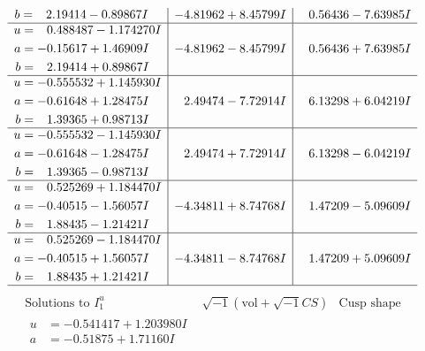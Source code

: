 \documentclass[1p]{elsarticle_modified}
\theoremstyle{definition}
\newcommand{\I}{\sqrt{-1}}
\begin{document}
$$\begin{array}{c|c|c}
\begin{aligned}
b &= \phantom{-}2.19414 - 0.89867 I\end{aligned}
 & -4.81962 + 8.45799 I & \phantom{-}0.56436 - 7.63985 I \\ \hline\begin{aligned}
u &= \phantom{-}0.488487 - 1.174270 I \\
a &= -0.15617 + 1.46909 I \\
b &= \phantom{-}2.19414 + 0.89867 I\end{aligned}
 & -4.81962 - 8.45799 I & \phantom{-}0.56436 + 7.63985 I \\ \hline\begin{aligned}
u &= -0.555532 + 1.145930 I \\
a &= -0.61648 + 1.28475 I \\
b &= \phantom{-}1.39365 + 0.98713 I\end{aligned}
 & \phantom{-}2.49474 - 7.72914 I & \phantom{-}6.13298 + 6.04219 I \\ \hline\begin{aligned}
u &= -0.555532 - 1.145930 I \\
a &= -0.61648 - 1.28475 I \\
b &= \phantom{-}1.39365 - 0.98713 I\end{aligned}
 & \phantom{-}2.49474 + 7.72914 I & \phantom{-}6.13298 - 6.04219 I \\ \hline\begin{aligned}
u &= \phantom{-}0.525269 + 1.184470 I \\
a &= -0.40515 - 1.56057 I \\
b &= \phantom{-}1.88435 - 1.21421 I\end{aligned}
 & -4.34811 + 8.74768 I & \phantom{-}1.47209 - 5.09609 I \\ \hline\begin{aligned}
u &= \phantom{-}0.525269 - 1.184470 I \\
a &= -0.40515 + 1.56057 I \\
b &= \phantom{-}1.88435 + 1.21421 I\end{aligned}
 & -4.34811 - 8.74768 I & \phantom{-}1.47209 + 5.09609 I\\
 \hline 
 \end{array}$$\newpage$$\begin{array}{c|c|c}  
\text{Solutions to }I^u_{1}& \I (\text{vol} + \sqrt{-1}CS) & \text{Cusp shape}\\
 \hline 
\begin{aligned}
u &= -0.541417 + 1.203980 I \\
a &= -0.51875 + 1.71160 I \\

\end{aligned}
\end{array}$$
\end{document}
